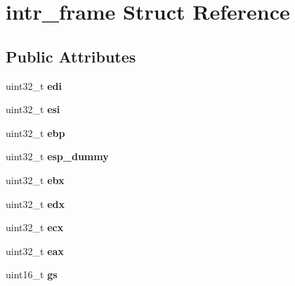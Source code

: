 \hypertarget{structintr__frame}{}\section{intr\+\_\+frame Struct Reference}
\label{structintr__frame}
\subsection*{Public Attributes}
\begin{DoxyCompactItemize}
\item 
uint32\+\_\+t {\bfseries edi}\hypertarget{structintr__frame_ac7dcd3ff5e0eadd92d3e998fce6c83cc}{}\label{structintr__frame_ac7dcd3ff5e0eadd92d3e998fce6c83cc}

\item 
uint32\+\_\+t {\bfseries esi}\hypertarget{structintr__frame_ade7a4007ee748b10ca2ad37c94f89ef2}{}\label{structintr__frame_ade7a4007ee748b10ca2ad37c94f89ef2}

\item 
uint32\+\_\+t {\bfseries ebp}\hypertarget{structintr__frame_aca6b77168c58177683f839a31c9499d3}{}\label{structintr__frame_aca6b77168c58177683f839a31c9499d3}

\item 
uint32\+\_\+t {\bfseries esp\+\_\+dummy}\hypertarget{structintr__frame_a53c788aace1f6e8dce31a0c1b8e5efbd}{}\label{structintr__frame_a53c788aace1f6e8dce31a0c1b8e5efbd}

\item 
uint32\+\_\+t {\bfseries ebx}\hypertarget{structintr__frame_a5836123b995e4f029df26009ad2e32bb}{}\label{structintr__frame_a5836123b995e4f029df26009ad2e32bb}

\item 
uint32\+\_\+t {\bfseries edx}\hypertarget{structintr__frame_ab3e46e99e78343016ebfc2db8d2bab4c}{}\label{structintr__frame_ab3e46e99e78343016ebfc2db8d2bab4c}

\item 
uint32\+\_\+t {\bfseries ecx}\hypertarget{structintr__frame_ab2c4de68744ed3116cf89cc90f840ee0}{}\label{structintr__frame_ab2c4de68744ed3116cf89cc90f840ee0}

\item 
uint32\+\_\+t {\bfseries eax}\hypertarget{structintr__frame_aca38582b8d9a281dcf21ee0e064ad615}{}\label{structintr__frame_aca38582b8d9a281dcf21ee0e064ad615}

\item 
uint16\+\_\+t {\bfseries gs}\hypertarget{structintr__frame_ac0acccfad5d77495802651d27d2e729f}{}\label{structintr__frame_ac0acccfad5d77495802651d27d2e729f}


\end{DoxyCompactItemize}
